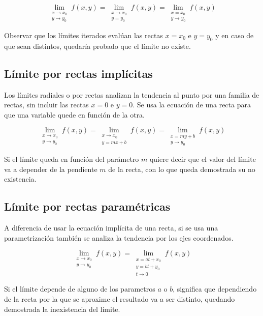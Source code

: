\begin{equation*}
    \lim_{\substack{x \to x_0\\y \to y_0}} f(x,y)
    = \lim_{\substack{x \to x_0\\y = y_0}} f(x,y)
    = \lim_{\substack{x = x_0\\y \to y_0}} f(x,y)
\end{equation*}

Observar que los límites iterados evalúan las rectas $x=x_0$ e $y=y_0$ y en caso de que sean distintos, quedaría probado que el límite no existe.

\subsection{Límite por rectas implícitas}

Los límites radiales o por rectas analizan la tendencia al punto por una familia de rectas, sin incluir las rectas $x=0$ e $y=0$.
Se usa la ecuación de una recta para que una variable quede en función de la otra.

\begin{equation*}
    \lim_{\substack{x \to x_0\\y \to y_0}} f(x,y)
    = \lim_{\substack{x \to x_0\\y=mx+b}} f(x,y)
    = \lim_{\substack{x=my+b\\y \to y_0}} f(x,y)
\end{equation*}

Si el límite queda en función del parámetro $m$ quiere decir que el valor del límite va a depender de la pendiente $m$ de la recta, con lo que queda demostrada su no existencia.


\subsection{Límite por rectas paramétricas}

A diferencia de usar la ecuación implícita de una recta, si se usa una parametrización también se analiza la tendencia por los ejes coordenados.

\begin{equation*}
    \lim_{\substack{x \to x_0\\y \to y_0}} f(x,y)
    = \lim_{\substack{x=at+x_0\\y=bt+y_0\\t \to 0}} f(x,y)
\end{equation*}

Si el límite depende de alguno de los parametros $a$ o $b$, significa que dependiendo de la recta por la que se aproxime el resultado va a ser distinto, quedando demostrada la inexistencia del límite.


